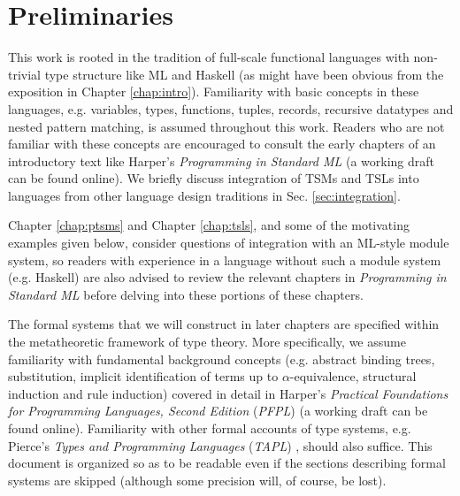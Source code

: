 
\section{Preliminaries}
This work is rooted in the tradition of full-scale functional languages with non-trivial type structure like ML and Haskell (as might have been obvious from the exposition in Chapter \ref{chap:intro}). Familiarity with basic concepts in these languages, e.g. variables, types, functions, tuples, records,  recursive datatypes and nested pattern matching, is assumed throughout this work. Readers who are not familiar with these concepts are encouraged to consult the early chapters of an introductory text like Harper's \emph{Programming in Standard ML} \cite{harper1997programming} (a working draft can be found online). We briefly discuss integration of TSMs and TSLs into languages from other language design traditions in Sec. \ref{sec:integration}.

Chapter \ref{chap:ptsms} and Chapter \ref{chap:tsls}, and some of the motivating examples given below, consider questions of integration with an ML-style module system, so readers with experience in a language without such a module system (e.g. Haskell) are also advised to review the relevant chapters in \emph{Programming in Standard ML} \cite{harper1997programming} before delving into these portions of these chapters.

The formal systems that we will construct in later chapters are specified within the metatheoretic framework of type theory. More specifically, we assume familiarity with fundamental background concepts (e.g. abstract binding trees, substitution, implicit identification of terms up to $\alpha$-equivalence, structural induction and rule induction) covered in detail in Harper's \emph{Practical Foundations for Programming Languages, Second Edition} (\emph{PFPL}) \cite{pfpl} (a working draft can be found online). Familiarity with other formal accounts of type systems, e.g. Pierce's \emph{Types and Programming Languages} (\emph{TAPL}) \cite{tapl}, should also suffice. This document is organized so as to be readable even if the sections describing formal systems are skipped (although some precision will, of course, be lost).

